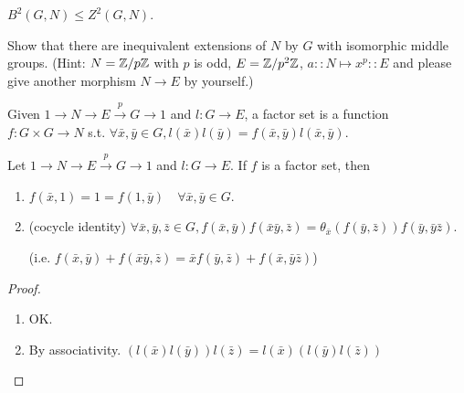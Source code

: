 \begin{exercise}
  $B^2(G, N) \le Z^2(G, N)$.
\end{exercise}
\begin{exercise}
  Show that there are inequivalent  extensions of $N$ by $G$ with isomorphic
  middle groups.
  (Hint: $N={\mathbb{Z}}/{p\mathbb{Z}}$ with $p$ is odd, $E={\mathbb{Z}}/{p^2\mathbb{Z}}$,
  $a:: N \mapsto x^p::E$ and please give another morphism $N\to E$ by yourself.)
\end{exercise}

\begin{definition}
  Given $1\to N\to E\xrightarrow{p} G\to 1$ and $l: G\to E$, a factor set is
  a function $f: G\times G \to N$ s.t.
  $\forall \bar{x}, \bar{y}\in G, l(\bar{x})l(\bar{y})
  = f(\bar{x}, \bar{y})l(\bar{x}, \bar{y})$.
\end{definition}

\begin{prop}
  Let $1\to N \to E\xrightarrow{p} G\to 1$ and $l: G\to E$.
  If $f$ is a factor set, then
  \begin{enumerate}[(1)]
    \item $f(\bar{x}, 1) = 1 = f(1, \bar{y}) \quad \forall \bar{x}, \bar{y}\in G$.
    \item (cocycle identity) $\forall \bar{x},\bar{y},\bar{z}\in G,
      f(\bar{x},\bar{y})f(\bar{x}\bar{y}, \bar{z})
      = \theta_{\bar{x}}(f(\bar{y}, \bar{z}))f(\bar{y}, \bar{y}\bar{z})$.

      (i.e. $f(\bar{x}, \bar{y}) + f(\bar{x}\bar{y},\bar{z})
      = \bar{x}f(\bar{y},\bar{z}) + f(\bar{x}, \bar{y}\bar{z})$)
  \end{enumerate}
  \begin{proof} \mbox{}
    \begin{enumerate}[(1)]
      \item OK.
      \item By associativity. $(l(\bar{x})l(\bar{y}))l(\bar{z}) = l(\bar{x})(l(\bar{y})l(\bar{z}))$
        \qedhere
    \end{enumerate}
  \end{proof}
  \label{prop:factor-set}
\end{prop}

